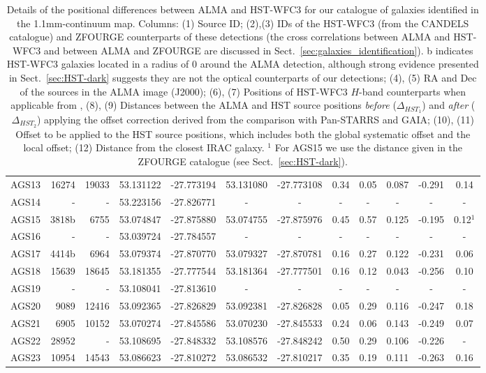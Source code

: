 \documentclass[longauth]{aa}
\begin{document}
\begin{table*}
\begin{tabular}{r r r c c c c c c c c c}
AGS13 	&  16274  &  19033 	&  53.131122 & -27.773194 &  53.131080 & -27.773108 &    0.34 &    0.05 &    0.087 &   -0.291 & 0.14\\
AGS14 	&      -  	&      - 	&  53.223156 & -27.826771 &     -      	&     -      	      &    -       &    -      &     -        &     -      & -\\
AGS15 	&   3818b 	&   6755	&  53.074847 & -27.875880 &  53.074755 & -27.875976 &    0.45 &    0.57 &    0.125 &   -0.195 & 0.12$^1$\\
AGS16 	&      -  	&      - 	&  53.039724 & -27.784557 &     -      	&     -              &    -       &    -      &     -      	&     -      & -\\
AGS17 	&   4414b 	&   6964 	&  53.079374 & -27.870770 &  53.079327 & -27.870781 &    0.16 &    0.27 &    0.122 &   -0.231 & 0.06\\
AGS18 	&  15639  &  18645	&  53.181355 & -27.777544 &  53.181364 & -27.777501 &    0.16 &    0.12 &    0.043 &   -0.256 & 0.10\\
AGS19 	&      -  	&      - 	&  53.108041 & -27.813610 &     -      	&     -              &    -       &    -      &     -      	&     -      & -\\
AGS20 	&   9089  	&  12416	&  53.092365 & -27.826829 &  53.092381 & -27.826828 &    0.05 &    0.29 &    0.116 &   -0.247 & 0.18\\
\hline
AGS21 	&   6905  	&  10152 	&  53.070274 & -27.845586 &  53.070230 & -27.845533 &    0.24 &    0.06 &    0.143 &   -0.249 & 0.07\\
AGS22 	&  28952  &      - 	&  53.108695 & -27.848332 &  53.108576 & -27.848242 &    0.50 &    0.29 &    0.106 &   -0.226 & -\\
AGS23  	&  10954  &  14543	&  53.086623 & -27.810272 &  53.086532 & -27.810217 &    0.35 &    0.19 &    0.111 &   -0.263 & 0.16\\
\hline                  
\end{tabular}
\caption{Details of the positional differences between ALMA and HST-WFC3 for our catalogue of galaxies identified in the 1.1mm-continuum map. Columns: (1) Source ID; (2),(3) IDs of the HST-WFC3 (from the CANDELS catalogue) and ZFOURGE counterparts of these detections (the cross correlations between ALMA and HST-WFC3 and between ALMA and ZFOURGE are discussed in Sect.~\ref{sec:galaxies_identification}). b indicates HST-WFC3 galaxies located in a radius of 0 around the ALMA detection, although strong evidence presented in Sect.~\ref{sec:HST-dark} suggests they are not the optical counterparts of our detections; (4), (5) RA and Dec of the sources in the ALMA image (J2000);  (6), (7) Positions of HST-WFC3 $H$-band counterparts when applicable from \cite{Guo2013}, (8), (9) Distances between the ALMA and HST source positions \textit{before} ($\Delta _{HST_1}$) and \textit{after} ($\Delta _{HST_2}$) applying the offset correction derived from the comparison with Pan-STARRS and GAIA;  (10), (11) Offset to be applied to the HST source positions, which includes both the global systematic offset and the local offset; (12) Distance from the closest IRAC galaxy. $^1$ For AGS15 we use the distance given in the ZFOURGE catalogue (see Sect.~\ref{sec:HST-dark}).}

\end{table*}
\end{document}
